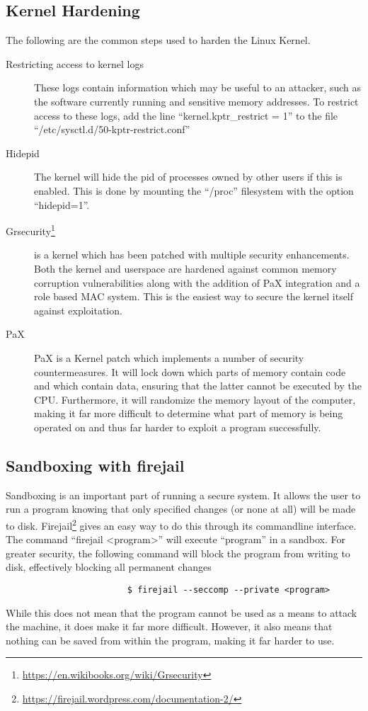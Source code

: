 			\subsection{Kernel Hardening}
				The following are the common steps used to harden the Linux Kernel.
				\begin{description}
					\item[Restricting access to kernel logs]
						These logs contain information which may be useful to an attacker, such as the software currently running and sensitive memory addresses.
						To restrict access to these logs, add the line ``kernel.kptr\_restrict = 1'' to the file ``/etc/sysctl.d/50-kptr-restrict.conf''
					\item[Hidepid]
						The kernel will hide the pid of processes owned by other users if this is enabled. This is done by mounting the ``/proc'' filesystem with the option ``hidepid=1''.
					\item[Grsecurity\footnote{\url{https://en.wikibooks.org/wiki/Grsecurity}}]
						is a kernel which has been patched with multiple security enhancements.
						Both the kernel and userspace are hardened against common memory corruption vulnerabilities along with the addition of PaX integration and a role based MAC system. This is the easiest way to secure the kernel itself against exploitation.
					\item[PaX] PaX is a Kernel patch which implements a number of security countermeasures.
						It will lock down which parts of memory contain code and which contain data, ensuring that the latter cannot be executed by the CPU.
						Furthermore, it will randomize the memory layout of the computer, making it far more difficult to determine what part of memory is being operated on and thus far harder to exploit a program successfully.
				\end{description}
				\subsection{Sandboxing with firejail}
					Sandboxing is an important part of running a secure system.
					It allows the user to run a program knowing that only specified changes (or none at all) will be made to disk.
					Firejail\footnote{\url{https://firejail.wordpress.com/documentation-2/}} gives an easy way to do this through its commandline interface.
					The command ``firejail <program>'' will execute ``program'' in a sandbox.
					For greater security, the following command will block the program from writing to disk, effectively blocking all permanent changes
					\begin{verbatim}
						$ firejail --seccomp --private <program>
					\end{verbatim}
					While this does not mean that the program cannot be used as a means to attack the machine, it does make it far more difficult.
					However, it also means that nothing can be saved from within the program, making it far harder to use.

